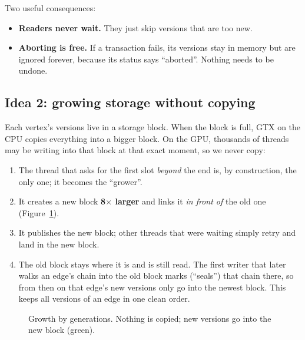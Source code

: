 \documentclass[11pt,a4paper]{article}
\begin{document}
Two useful consequences:
\begin{itemize}
\item \textbf{Readers never wait.} They just skip versions that are too new.
\item \textbf{Aborting is free.} If a transaction fails, its versions stay in memory but are ignored forever, because
  its status says ``aborted''. Nothing needs to be undone.
\end{itemize}

\subsection{Idea 2: growing storage without copying}
Each vertex's versions live in a storage block. When the block is full, GTX on the CPU copies everything into a bigger
block. On the GPU, thousands of threads may be writing into that block at that exact moment, so we never copy:
\begin{enumerate}
\item The thread that asks for the first slot \emph{beyond} the end is, by construction, the only one; it becomes the
  ``grower''.
\item It creates a new block \textbf{8$\times$ larger} and links it \emph{in front of} the old one (Figure~\ref{fig:grow}).
\item It publishes the new block; other threads that were waiting simply retry and land in the new block.
\item The old block stays where it is and is still read. The first writer that later walks an edge's chain into the
  old block marks (``seals'') that chain there, so from then on that edge's new versions only go into the newest block.
  This keeps all versions of an edge in one clean order.
\end{enumerate}

\begin{figure}[H]
\centering
{}
\caption{Growth by generations. Nothing is copied; new versions go into the new block (green).}
\label{fig:grow}
\end{figure}
\end{document}
